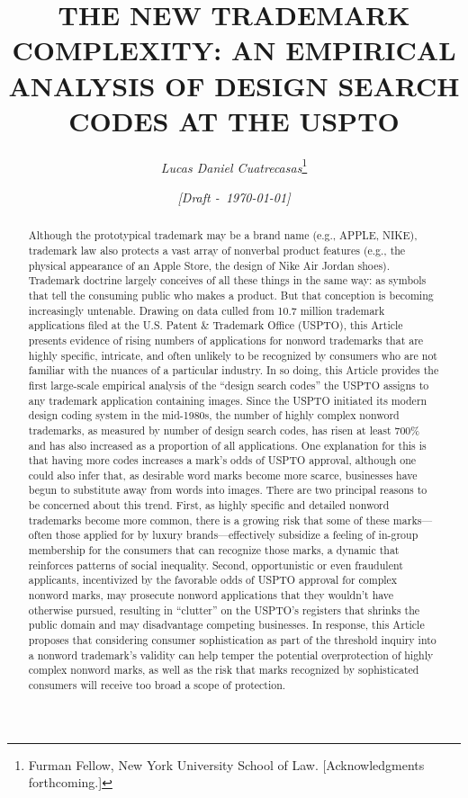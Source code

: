 \documentclass[letterpaper, 11pt, oneside]{article}
\title{\Large{\uppercase{The New Trademark Complexity: An Empirical Analysis of Design Search Codes at the USPTO}}}
\author{\large\textit{Lucas Daniel Cuatrecasas}\thanks{Furman Fellow, New York University School of Law. [Acknowledgments forthcoming.]}}
\date{\textit{\small [Draft -\ \today]}}
\begin{document}
\maketitle\thispagestyle{firstpage}

\begin{abstract}

\begin{itshape}

Although the prototypical trademark may be a brand name (e.g., APPLE, NIKE), trademark law also protects a vast array of nonverbal product features (e.g., the physical appearance of an Apple Store, the design of Nike Air Jordan shoes). Trademark doctrine largely conceives of all these things in the same way: as symbols that tell the consuming public who makes a product. But that conception is becoming increasingly untenable. Drawing on data culled from 10.7 million trademark applications filed at the U.S. Patent \& Trademark Office (USPTO), this Article presents evidence of rising numbers of applications for nonword trademarks that are highly specific, intricate, and often unlikely to be recognized by consumers who are not familiar with the nuances of a particular industry. In so doing, this Article provides the first large-scale empirical analysis of the ``design search codes'' the USPTO assigns to any trademark application containing images. Since the USPTO initiated its modern design coding system in the mid-1980s, the number of highly complex nonword trademarks, as measured by number of design search codes, has risen at least 700\% and has also increased as a proportion of all applications. One explanation for this is that having more codes increases a mark's odds of USPTO approval, although one could also infer that, as desirable word marks become more scarce, businesses have begun to substitute away from words into images. There are two principal reasons to be concerned about this trend. First, as highly specific and detailed nonword trademarks become more common, there is a growing risk that some of these marks—often those applied for by luxury brands—effectively subsidize a feeling of in-group membership for the consumers that can recognize those marks, a dynamic that reinforces patterns of social inequality. Second, opportunistic or even fraudulent applicants, incentivized by the favorable odds of USPTO approval for complex nonword marks, may prosecute nonword applications that they wouldn't have otherwise pursued, resulting in ``clutter'' on the USPTO's registers that shrinks the public domain and may disadvantage competing businesses. In response, this Article proposes that considering consumer sophistication as part of the threshold inquiry into a nonword trademark's validity can help temper the potential overprotection of highly complex nonword marks, as well as the risk that marks recognized by sophisticated consumers will receive too broad a scope of protection.

\end{itshape}

\end{abstract}
\end{document}
